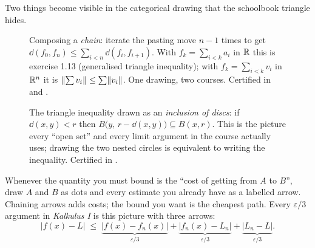 Two things become visible in the categorical drawing that the schoolbook triangle hides.

\begin{figure}[H]
\centering
{}
\caption{Composing a \emph{chain}: iterate the pasting move $n-1$ times to get
$\dd(f_0,f_n)\le\sum_{i<n}\dd(f_i,f_{i+1})$. With $f_k=\sum_{i<k}a_i$ in $\mathbb{R}$ this is
exercise 1.13 (generalised triangle inequality); with $f_k=\sum_{i<k}v_i$ in $\mathbb{R}^n$ it is
$\lVert \sum v_i\rVert\le\sum\lVert v_i\rVert$. One drawing, two courses. Certified in
 and .}
\label{fig:chain}
\end{figure}

\begin{figure}[H]
\centering
{}
\caption{The triangle inequality drawn as an \emph{inclusion of discs}: if
$\dd(x,y)<r$ then $B\bigl(y,\,r-\dd(x,y)\bigr)\subseteq B(x,r)$. This is the picture
every ``open set'' and every limit argument in the course actually uses; drawing the two
nested circles is equivalent to writing the inequality. Certified in
.}
\label{fig:balls}
\end{figure}

\begin{recipe}
Whenever the quantity you must bound is the ``cost of getting from $A$ to $B$'', draw $A$
and $B$ as dots and every estimate you already have as a labelled arrow. Chaining arrows
adds costs; the bound you want is the cheapest path. Every $\varepsilon/3$ argument in
\emph{Kalkulus I} is this picture with three arrows:
\[
|f(x)-L|\;\le\;\underbrace{|f(x)-f_n(x)|}_{\varepsilon/3}
+\underbrace{|f_n(x)-L_n|}_{\varepsilon/3}+\underbrace{|L_n-L|}_{\varepsilon/3}.
\]
\end{recipe}

